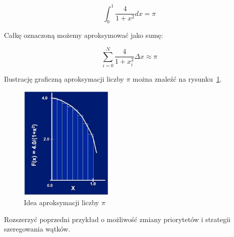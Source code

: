 \begin{myenumerate}
\begin{equation}\nonumber 
\displaystyle\int_0^1{\frac{4}{1+x^2}dx}=\pi
\end{equation}

Całkę oznaczoną możemy aproksymować jako sumę:

\begin{equation}\nonumber 
\sum_{i=0}^N\frac{4}{1+x_i^2}\Delta x\approx\pi
\end{equation}

Ilustrację graficzną aproksymacji liczby $\pi$ można znaleźć na rysunku~\ref{fig:piApprox}. 

\begin{figure}[!h]
\centering
\includegraphics[width=0.4\textwidth]{img/piApprox}
\caption{Idea aproksymacji liczby $\pi$}
\label{fig:piApprox}
\end{figure}



\item Rozszerzyć poprzedni przykład o możliwość zmiany priorytetów i strategii szeregowania wątków.
\end{myenumerate} 


\cleardoublepage
